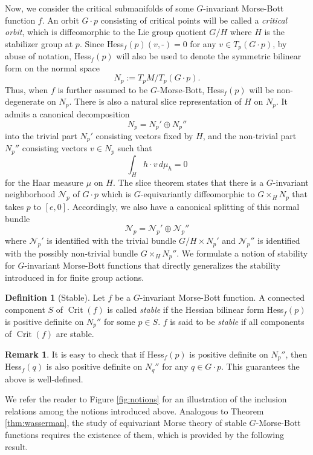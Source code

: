 \documentclass[11pt]{amsart}
\theoremstyle{definition}
\newtheorem{definition}[theorem]{Definition}
\newtheorem{remark}[theorem]{Remark}
\numberwithin{equation}{subsection}
\DeclareMathOperator{\crit}{Crit}
\begin{document}
Now, we consider the critical submanifolds of some $G$-invariant Morse-Bott function $f$. An orbit $G\cdot p$ consisting of critical points will be called a \emph{critical orbit}, which is diffeomorphic to the Lie group quotient $G/H$ where $H$ is the stabilizer group at $p$. Since Hess$_f(p)(v,\textrm{-})=0$ for any $v\in T_p(G\cdot p)$, by abuse of notation, Hess$_f(p)$ will also be used to denote the symmetric bilinear form on the normal space \[N_p:=T_pM/T_p(G\cdot p).\]  Thus, when $f$ is further assumed to be $G$-Morse-Bott, Hess$_f(p)$ will be non-degenerate on $N_p$. There is also a natural slice representation of $H$ on $N_p$. It admits a canonical decomposition \[N_p=N_p'\oplus N_p''\] into the trivial part $N_p'$ consisting vectors fixed by $H$, and the non-trivial part $N_p''$ consisting vectors $v\in N_p$ such that \[\int_H h\cdot v \,d\mu_h=0\]for the Haar measure $\mu$ on $H$. The slice theorem states that there is a $G$-invariant neighborhood $\mathcal{N}_p$ of $G\cdot p$ which is $G$-equivariantly diffeomorphic to $G\times_{H}N_p$ that takes $p$ to $[e,0]$. Accordingly, we also have a canonical splitting of this normal bundle \[\mathcal{N}_p=\mathcal{N}_p'\oplus \mathcal{N}_p''\] where $\mathcal{N}_p'$ is identified with the trivial bundle $G/H\times N_p'$ and $\mathcal{N}_p''$ is identified with the possibly non-trivial bundle $G\times _H N_p''$. We formulate a notion of stability for $G$-invariant Morse-Bott functions that directly generalizes the stability introduced in \cite{bao2024morse} for finite group actions.

\begin{definition}[Stable]\label{definition:stable G-Morse-Bott}
  Let $f$ be a $G$-invariant Morse-Bott function. A connected component $S$ of $\crit(f)$ is called \emph{stable} if the Hessian bilinear form Hess$_f(p)$ is positive definite on $N_p''$ for some $p\in S$. $f$ is said to be \emph{stable} if all components of $\crit(f)$ are stable. 
\end{definition}



\begin{remark}\label{rmk:stablewelldf}
    It is easy to check that if Hess$_f(p)$ is positive definite on $N_p''$, then Hess$_f(q)$ is also positive definite on $N_q''$ for any $q\in G\cdot p$. This guarantees the above is well-defined.
\end{remark}

We refer the reader to Figure \ref{fig:notions} for an illustration of the inclusion relations among the notions introduced above.
Analogous to Theorem \ref{thm:wasserman}, the study of equivariant Morse theory of stable $G$-Morse-Bott functions requires the existence of them, which is provided by the following result.
\end{document}
